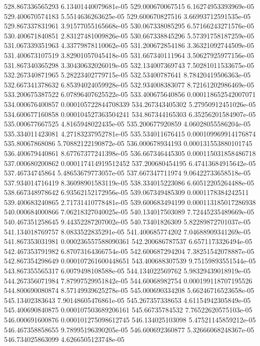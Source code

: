 {528.867336565293 6.13401440079681e-05
529.000670067515 6.16274953393969e-05
529.400670574183 5.5514636263625e-05
529.600670827516 3.66993712591535e-05
529.867337831961 3.91577055165668e-05
530.067338085295 6.57166243271576e-05
530.400671840851 2.83127481009826e-05
530.667338845296 5.57391758187259e-05
531.067339351963 4.33779878110062e-05
531.200672854186 3.36321092744509e-05
531.400673107519 3.82901057045418e-05
531.667340111964 3.50627925977156e-05
531.867340365298 3.30430632026019e-05
532.134007369743 7.50281011533675e-05
532.267340871965 5.28223402779715e-05
532.53400787641 8.78420419506363e-05
532.667341378632 6.85394024059928e-05
532.934008383077 8.72161202986469e-05
533.200675387522 6.07896407625522e-05
533.400675640856 0.000118652542007071
534.000676400857 0.000105722844708339
534.267343405302 5.27950912451026e-05
534.600677160858 0.000104527363504241
534.867344165303 6.35256201584907e-05
535.000677667525 4.8165948022435e-05
535.200677920859 4.06028055586204e-05
535.334011423081 4.27183237952781e-05
535.534011676415 0.000109969914176874
535.80067868086 5.70882122190872e-05
536.000678934193 0.000131553880101745
536.400679440861 8.67767377241398e-05
536.667346445305 0.000115031858486718
537.000680200862 0.000117414919512452
537.200680454195 6.47413684915642e-05
537.46734745864 5.48653679773057e-05
537.667347711974 9.06422733658518e-05
537.934014716419 8.36098901583119e-05
538.334015223086 6.60512205264488e-05
538.667348978642 6.93562152172956e-05
539.067349485309 0.0001178384242511
539.400683240865 2.71731410778481e-05
539.600683494199 0.000113185017286938
540.000684000866 7.06218327040025e-05
540.134017503089 7.72445235489669e-05
540.467351258645 9.44352287207002e-05
540.73401826309 5.82289872701037e-05
541.134018769757 8.0833522835291e-05
541.400685774202 7.04688909341269e-05
541.867353031981 0.000236557588090361
542.200686787537 6.6571173326494e-05
542.467353791982 6.87073164366754e-05
542.600687294204 7.38251542078887e-05
542.867354298649 0.000107261600448651
543.400688307539 9.75159893551544e-05
543.867355565317 6.0079498108588e-05
544.134022569762 5.98329439018919e-05
544.267356071984 7.87997529951842e-05
544.60068982754 0.000199118707195526
544.800690080874 8.57149939625278e-05
545.000690334208 5.66246716523658e-05
545.13402383643 7.90148605476861e-05
545.267357338653 4.61154942305849e-05
545.400690840875 0.000107503689206161
545.66735784532 7.76522620575103e-05
546.000691600876 0.000101275098612745
546.134025103098 5.47521145859212e-05
546.467358858655 9.78995196390205e-05
546.600692360877 5.32666068248367e-05
546.734025863099 4.6266505123748e-05
}
